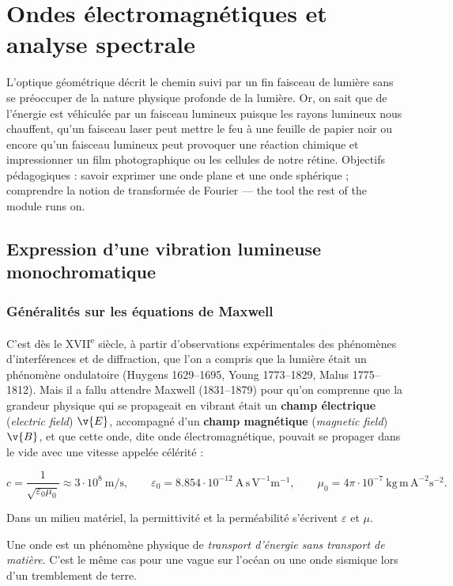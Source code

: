 \section{Ondes électromagnétiques et analyse spectrale}

L'optique géométrique décrit le chemin suivi par un fin faisceau de lumière sans
se préoccuper de la nature physique profonde de la lumière. Or, on sait que de
l'énergie est véhiculée par un faisceau lumineux puisque les rayons lumineux nous
chauffent, qu'un faisceau laser peut mettre le feu à une feuille de papier noir
ou encore qu'un faisceau lumineux peut provoquer une réaction chimique et
impressionner un film photographique ou les cellules de notre rétine. Objectifs
pédagogiques : savoir exprimer une onde plane et une onde sphérique ; comprendre
la notion de transformée de Fourier --- the tool the rest of the module runs on.

\subsection{Expression d'une vibration lumineuse monochromatique}

\subsubsection{Généralités sur les équations de Maxwell}

C'est dès le XVII\textsuperscript{e} siècle, à partir d'observations
expérimentales des phénomènes d'interférences et de diffraction, que l'on a
compris que la lumière était un phénomène ondulatoire (Huygens 1629--1695, Young
1773--1829, Malus 1775--1812). Mais il a fallu attendre Maxwell (1831--1879) pour
qu'on comprenne que la grandeur physique qui se propageait en vibrant était un
\textbf{champ électrique} (\textit{electric field}) $\v{E}$, accompagné d'un
\textbf{champ magnétique} (\textit{magnetic field}) $\v{B}$, et que cette onde,
dite onde électromagnétique, pouvait se propager dans le vide avec une vitesse
appelée célérité :

\[
  c=\frac{1}{\sqrt{\varepsilon_0\mu_0}}\approx 3\cdot 10^{8}\ \mathrm{m/s},
  \qquad
  \varepsilon_0=8.854\cdot 10^{-12}\ \mathrm{A\,s\,V^{-1}m^{-1}},
  \qquad
  \mu_0=4\pi\cdot 10^{-7}\ \mathrm{kg\,m\,A^{-2}s^{-2}} .
\]

Dans un milieu matériel, la permittivité et la perméabilité s'écrivent
$\varepsilon$ et $\mu$.

\begin{definition}
  Une onde est un phénomène physique de \emph{transport d'énergie sans
  transport de matière}. C'est le même cas pour une vague sur l'océan ou une
  onde sismique lors d'un tremblement de terre.
\end{definition}

